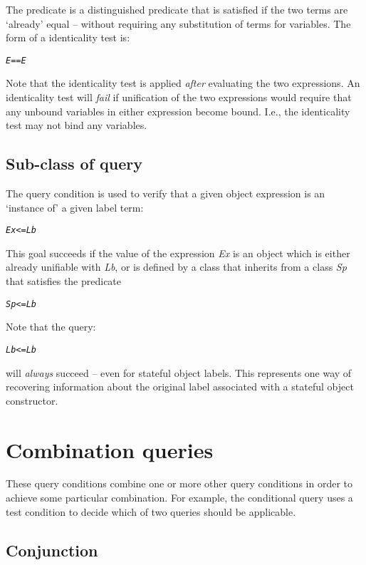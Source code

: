 The \q{==} predicate is a distinguished predicate that is satisfied if the two terms are `already' equal -- without requiring any substitution of terms for variables. The form of a identicality test is:
\begin{alltt}
\emph{E} == \emph{E}
\end{alltt}
Note that the identicality test is applied \emph{after} evaluating the two expressions. An identicality test will \emph{fail} if unification of the two expressions would require that any unbound variables in either expression become bound. I.e., the identicality test may not bind any variables.

\subsection{Sub-class of query}
\label{goal:subclass}

The \q{<=} query condition is used to verify that a given object expression is an `instance of' a given label term:
\begin{alltt}
\emph{Ex} <= \emph{Lb}
\end{alltt}
This goal succeeds if the value of the expression \emph{Ex} is an object which is either already unifiable with \emph{Lb}, or is defined by a class that inherits from a class \emph{Sp} that satisfies the predicate
\begin{alltt}
\emph{Sp} <= \emph{Lb}
\end{alltt}
Note that the query:
\begin{alltt}
\emph{Lb} <= \emph{Lb}
\end{alltt}
will \emph{always} succeed -- even for stateful object labels. This represents one way of recovering information about the original label associated with a stateful object constructor.

\section{Combination queries}
\label{goals:combination}

These query conditions combine one or more other query conditions in order to achieve some particular combination. For example, the conditional query uses a test condition to decide which of two queries should be applicable.

\subsection{Conjunction}
\label{goal:conjunction}

